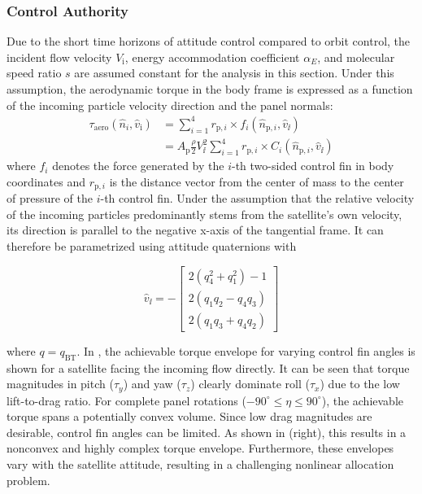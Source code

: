 \documentclass[pdflatex,sn-mathphys-num]{sn-jnl}%
\theoremstyle{thmstyleone}%
\theoremstyle{thmstyletwo}%
\theoremstyle{thmstylethree}%
\begin{document}
		\subsubsection{Control Authority}
		Due to the short time horizons of attitude control compared to orbit control, the incident flow velocity \(V_\text{i}\), energy accommodation coefficient \(\alpha_E\), and molecular speed ratio \(s\) are assumed constant for the analysis in this section. Under this assumption, the aerodynamic torque in the body frame is expressed as a function of the incoming particle velocity direction and the panel normals:
		\begin{equation}
		\begin{aligned}
			\tau_{\text{aero}}(\hat{n}_i, \hat{v}_\text{i}) &= \sum_{i=1}^{4} r_{\text{p},i}\times f_i(\hat{n}_{\text{p},i},\hat{v}_\ii) \\  
			&= A_{\text{p}}\frac{\rho}{2} V_\ii^2 \sum_{i=1}^{4} r_{\text{p},i}\times C_i(\hat{n}_{\text{p},i},\hat{v}_\ii)
		\end{aligned}
		\label{eq:torque_simplified}
		\end{equation}
		where $f_i$ denotes the force generated by the $i$-th two-sided control fin in body coordinates and $r_{\text{p},i}$ is the distance vector from the center of mass to the center of pressure of the $i$-th control fin.
		Under the assumption that the relative velocity of the incoming particles predominantly stems from the satellite's own velocity, its direction is parallel to the negative x-axis of the tangential frame.
		It can therefore be parametrized using attitude quaternions with

		\begin{equation}
			\hat{v}_\ii = -\begin{bmatrix}
				2(q_4^2+q_1^2)-1 \\ 2(q_1q_2 -q_4q_3) \\ 2(q_1q_3 + q_4q_2)
			\end{bmatrix}
			\label{eq:quat_to_flow}
		\end{equation}

		where $q=q_{\text{BT}}$.
		In , the achievable torque envelope for varying control fin angles is shown for a satellite facing the incoming flow directly.
		It can be seen that torque magnitudes in pitch ($\tau_y$) and yaw ($\tau_z$) clearly dominate roll ($\tau_x$) due to the low lift-to-drag ratio. 
		For complete panel rotations ($-90^{\circ} \leq \eta \leq 90^{\circ}$), the achievable torque spans a potentially convex volume.
		Since low drag magnitudes are desirable, control fin angles can be limited.
		As shown in  (right), this results in a nonconvex and highly complex torque envelope. Furthermore, these envelopes vary with  the satellite attitude, resulting in a challenging nonlinear allocation problem.
\end{document}
